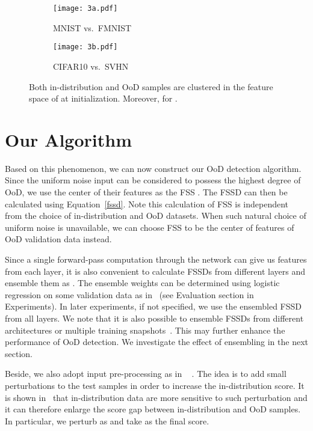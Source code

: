 \documentclass[letterpaper]{article}
\begin{document}
\begin{figure}
    \centering
    \begin{subfigure}{0.45\textwidth}
         \centering
         \texttt{[image: 3a.pdf]}
          \caption{MNIST vs.\ FMNIST}
         \label{concentrate1}
    \end{subfigure}
    \begin{subfigure}{0.45\textwidth}
         \centering
         \texttt{[image: 3b.pdf]}
          \caption{CIFAR10 vs.\ SVHN}
         \label{concentrate3}
    \end{subfigure}
    \caption{Both in-distribution and OoD samples are clustered in the feature space of  at initialization. Moreover,  for .
}
    \label{concentration}
\end{figure}


\section{Our Algorithm}

Based on this phenomenon, we can now construct our OoD detection algorithm. 
Since the uniform noise input can be considered to possess the highest degree of OoD, we use the center of their features as the FSS . The FSSD can then be calculated using Equation~\eqref{fssd}. Note this calculation of FSS  is independent from the choice of in-distribution and OoD datasets. When such natural choice of uniform noise is unavailable, we can choose FSS  to be the center of features of OoD validation data instead.

Since a single forward-pass computation through the network  can give us features from each layer, it is also convenient to calculate FSSDs from different layers and ensemble them as .
The ensemble weights  can be determined using logistic regression on some validation data as in~\cite{mahalanobis} (see Evaluation section in Experiments).
In later experiments, if not specified, we use the ensembled FSSD from all layers.
We note that it is also possible to ensemble FSSDs from different architectures or multiple training snapshots~\cite{hor_and_ver_ensemble, snapshot}. This may further enhance the performance of OoD detection.
We investigate the effect of ensembling in the next section. 

Beside, we also  adopt input pre-processing as in ~\cite{odin, mahalanobis} .
The idea is to add small perturbations to the test samples in order to increase the in-distribution score.
It is shown in~\cite{odin, kamoi2020mahalanobis} that in-distribution data are more sensitive to such perturbation and it can therefore enlarge the score gap between in-distribution and OoD samples.
In particular, we perturb as  and take  as the final score.
\end{document}
